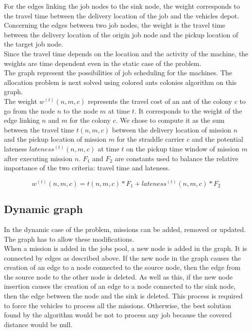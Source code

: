 \documentclass[a4paper,10pt]{article}
\begin{document}
For the edges linking the job nodes to the sink node, the weight corresponds to the travel time between the delivery location of the job and the vehicles depot.\\

Concerning the edges between two job nodes, the weight is the travel time between the delivery location of the origin job node and the pickup location of the target job node.\\

Since the travel time depends on the location and the activity of the machine, the weights are time dependent even in the static case of the problem.\\

The graph represent the possibilities of job scheduling for the machines. The allocation problem is next solved using colored ants colonies algorithm on this graph.\\

The weight $w^{(t)}(n,m,c)$ represents the travel cost of an ant of the colony $c$ to go from the node $n$ to the node $m$ at time $t$. It corresponds to the weight of the edge linking $n$ and $m$ for the colony $c$. We chose to compute it as the sum between the travel time $t(n,m,c)$ between the delivery location of mission $n$ and the pickup location of mission $m$ for the straddle carrier $c$ and the potential lateness $lateness^{(t)}(n,m,c)$ at time $t$ on the pickup time window of mission $m$ after executing mission $n$. $F_1$ and $F_2$ are constants used to balance the relative importance of the two criteria: travel time and lateness.

\begin{equation*}
  w^{(t)}(n,m,c) = t(n,m,c)*F_1 + lateness^{(t)}(n,m,c)*F_2
\end{equation*}

\subsection{Dynamic graph}
In the dynamic case of the problem, missions can be added, removed or updated. The graph has to allow these modifications.\\

When a mission is added in the jobs pool, a new node is added in the graph. It is connected by edges as described above. If the new node in the graph causes the creation of an edge to a node connected to the source node, then the edge from the source node to the other node is deleted. As well as this, if the new node insertion causes the creation of an edge to a node connected to the sink node, then the edge between the node and the sink is deleted. This process is required to force the vehicles to process all the missions. Otherwise, the best solution found by the algorithm would be not to process any job because the covered distance would be null.
\\
\end{document}
